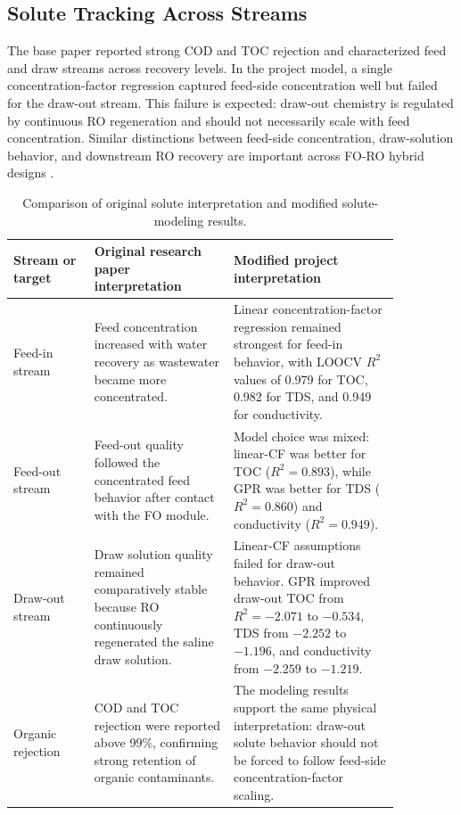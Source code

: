 \documentclass[journal, onecolumn, 12pt]{IEEEtran}
\begin{document}
\subsection{Solute Tracking Across Streams}
The base paper reported strong COD and TOC rejection and characterized feed and draw streams across recovery levels. In the project model, a single concentration-factor regression captured feed-side concentration well but failed for the draw-out stream. This failure is expected: draw-out chemistry is regulated by continuous RO regeneration and should not necessarily scale with feed concentration. Similar distinctions between feed-side concentration, draw-solution behavior, and downstream RO recovery are important across FO-RO hybrid designs \cite{b7}.

\begin{table}[H]
\centering
\caption{Comparison of original solute interpretation and modified solute-modeling results.}
\label{tab:original_modified_solute}
\begin{tabular}{p{0.18\linewidth}p{0.31\linewidth}p{0.37\linewidth}}
\toprule
Stream or target & Original research paper interpretation & Modified project interpretation \\
\midrule
Feed-in stream & Feed concentration increased with water recovery as wastewater became more concentrated. & Linear concentration-factor regression remained strongest for feed-in behavior, with LOOCV $R^2$ values of 0.979 for TOC, 0.982 for TDS, and 0.949 for conductivity. \\
Feed-out stream & Feed-out quality followed the concentrated feed behavior after contact with the FO module. & Model choice was mixed: linear-CF was better for TOC ($R^2=0.893$), while GPR was better for TDS ($R^2=0.860$) and conductivity ($R^2=0.949$). \\
Draw-out stream & Draw solution quality remained comparatively stable because RO continuously regenerated the saline draw solution. & Linear-CF assumptions failed for draw-out behavior. GPR improved draw-out TOC from $R^2=-2.071$ to $-0.534$, TDS from $-2.252$ to $-1.196$, and conductivity from $-2.259$ to $-1.219$. \\
Organic rejection & COD and TOC rejection were reported above 99\%, confirming strong retention of organic contaminants. & The modeling results support the same physical interpretation: draw-out solute behavior should not be forced to follow feed-side concentration-factor scaling. \\
\bottomrule
\end{tabular}
\end{table}
\end{document}

